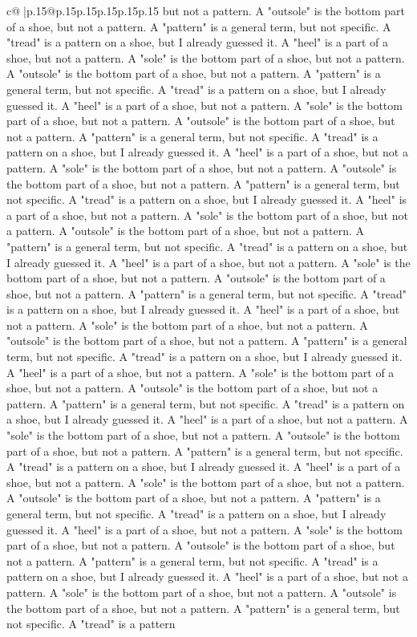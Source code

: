 \documentclass{article}
\begin{document}
{\begin{supertabular}{c@{$\;$}|p{.15\linewidth}@{}p{.15\linewidth}p{.15\linewidth}p{.15\linewidth}p{.15\linewidth}p{.15\linewidth}}
{{{but not a pattern. A "outsole" is the bottom part of a shoe, but not a pattern. A "pattern" is a general term, but not specific. A "tread" is a pattern on a shoe, but I already guessed it. A "heel" is a part of a shoe, but not a pattern. A "sole" is the bottom part of a shoe, but not a pattern. A "outsole" is the bottom part of a shoe, but not a pattern. A "pattern" is a general term, but not specific. A "tread" is a pattern on a shoe, but I already guessed it. A "heel" is a part of a shoe, but not a pattern. A "sole" is the bottom part of a shoe, but not a pattern. A "outsole" is the bottom part of a shoe, but not a pattern. A "pattern" is a general term, but not specific. A "tread" is a pattern on a shoe, but I already guessed it. A "heel" is a part of a shoe, but not a pattern. A "sole" is the bottom part of a shoe, but not a pattern. A "outsole" is the bottom part of a shoe, but not a pattern. A "pattern" is a general term, but not specific. A "tread" is a pattern on a shoe, but I already guessed it. A "heel" is a part of a shoe, but not a pattern. A "sole" is the bottom part of a shoe, but not a pattern. A "outsole" is the bottom part of a shoe, but not a pattern. A "pattern" is a general term, but not specific. A "tread" is a pattern on a shoe, but I already guessed it. A "heel" is a part of a shoe, but not a pattern. A "sole" is the bottom part of a shoe, but not a pattern. A "outsole" is the bottom part of a shoe, but not a pattern. A "pattern" is a general term, but not specific. A "tread" is a pattern on a shoe, but I already guessed it. A "heel" is a part of a shoe, but not a pattern. A "sole" is the bottom part of a shoe, but not a pattern. A "outsole" is the bottom part of a shoe, but not a pattern. A "pattern" is a general term, but not specific. A "tread" is a pattern on a shoe, but I already guessed it. A "heel" is a part of a shoe, but not a pattern. A "sole" is the bottom part of a shoe, but not a pattern. A "outsole" is the bottom part of a shoe, but not a pattern. A "pattern" is a general term, but not specific. A "tread" is a pattern on a shoe, but I already guessed it. A "heel" is a part of a shoe, but not a pattern. A "sole" is the bottom part of a shoe, but not a pattern. A "outsole" is the bottom part of a shoe, but not a pattern. A "pattern" is a general term, but not specific. A "tread" is a pattern on a shoe, but I already guessed it. A "heel" is a part of a shoe, but not a pattern. A "sole" is the bottom part of a shoe, but not a pattern. A "outsole" is the bottom part of a shoe, but not a pattern. A "pattern" is a general term, but not specific. A "tread" is a pattern on a shoe, but I already guessed it. A "heel" is a part of a shoe, but not a pattern. A "sole" is the bottom part of a shoe, but not a pattern. A "outsole" is the bottom part of a shoe, but not a pattern. A "pattern" is a general term, but not specific. A "tread" is a pattern on a shoe, but I already guessed it. A "heel" is a part of a shoe, but not a pattern. A "sole" is the bottom part of a shoe, but not a pattern. A "outsole" is the bottom part of a shoe, but not a pattern. A "pattern" is a general term, but not specific. A "tread" is a pattern }}}
\end{supertabular}}
\end{document}
